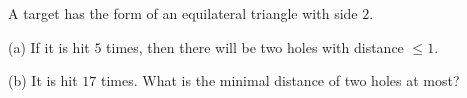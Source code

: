 A target has the form of an equilateral triangle with side $2$.

(a) If it is hit $5$ times, then there will be two holes with distance $\leq 1$.

(b) It is hit $17$ times. What is the minimal distance of two holes at most?
